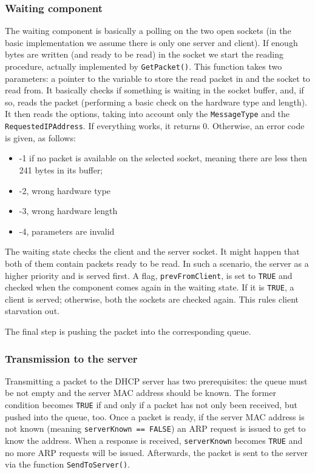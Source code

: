 \subsubsection{Waiting component}
The waiting component is basically a polling on the two open sockets (in the basic implementation we assume there is only one server and client). If enough bytes are written (and ready to be read) in the socket we start the reading procedure, actually implemented by \texttt{GetPacket()}. This function takes two parameters: a pointer to the variable to store the read packet in and the socket to read from. It basically checks if something is waiting in the socket buffer, and, if so, reads the packet (performing a basic check on the hardware type and length). It then reads the options, taking into account only the \texttt{MessageType} and the \texttt{RequestedIPAddress}. If everything works, it returns 0. Otherwise, an error code is given, as follows:
\begin{itemize}
	\item -1 if no packet is available on the selected socket, meaning
there are less then 241 bytes in its buffer;
	\item -2, wrong hardware type          
 	\item -3, wrong hardware length
	\item -4, parameters are invalid
\end{itemize}
The waiting state checks the client and the server socket. It might happen that both of them contain packets ready to be read. In such a scenario, the server as a higher priority and is served first. A flag, \texttt{prevFromClient}, is set to \texttt{TRUE} and checked when the component comes again in the waiting state. If it is \texttt{TRUE}, a client is served; otherwise, both the sockets are checked again. This rules client starvation out.

The final step is pushing the packet into the corresponding queue.

\subsubsection{Transmission to the server}
Transmitting a packet to the DHCP server has two prerequisites: the queue must be not empty and the server MAC address should be known. The former condition becomes \texttt{TRUE} if and only if a packet has not only been received, but pushed into the queue, too. Once a packet is ready, if the server MAC address is not known (meaning \texttt{serverKnown == FALSE}) an ARP request is issued to get to know the address. When a response is received, \texttt{serverKnown} becomes \texttt{TRUE} and no more ARP requests will be issued. Afterwards, the packet is sent to the server via the function \texttt{SendToServer()}. 

